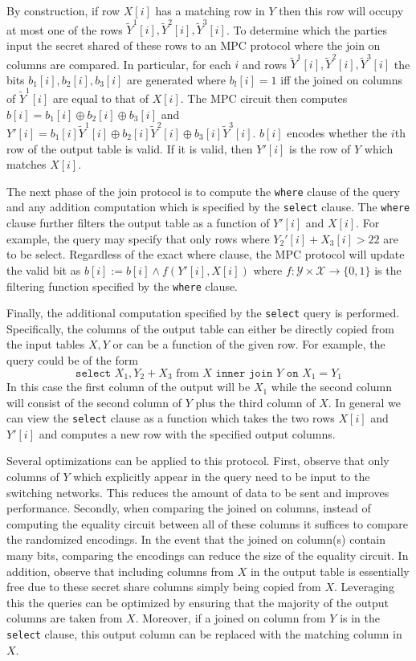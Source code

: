 By construction, if row $X[i]$ has a matching row in $Y$ then this row will occupy at most one of the rows ${\widetilde{Y}^1}[i],{\widetilde{Y}^2}[i],{\widetilde{Y}^3}[i]$. To determine which the parties input the secret shared of these rows to an MPC protocol where the join on columns are compared. In particular, for each $i$ and rows ${\widetilde{Y}^1}[i],{\widetilde{Y}^2}[i],{\widetilde{Y}^3}[i]$ the bits $b_1[i],b_2[i],b_3[i]$ are generated where $b_l[i]=1$ iff the joined on columns of ${\widetilde{Y}^1}[i]$ are equal to that of $X[i]$. The MPC circuit then computes $b[i]=b_1[i]\oplus b_2[i]\oplus b_3[i]$ and $Y'[i]=b_1[i]{\widetilde{Y}^1}[i]\oplus b_2[i]{\widetilde{Y}^2}[i]\oplus b_3[i]{\widetilde{Y}^3}[i]$. $b[i]$ encodes whether the $i$th row of the output table is valid. If it is valid, then $Y'[i]$ is the row of $Y$ which matches $X[i]$.

The next phase of the join protocol is to compute the \texttt{where} clause of the query and any addition computation which is specified by the \texttt{select} clause. The \texttt{where} clause further filters the output table as a function of $Y'[i]$ and $X[i]$. For example, the query may specify that only rows where $Y_2'[i] + X_3[i] > 22$  are to be select. Regardless of the exact where clause, the MPC protocol will update the valid bit as $b[i] := b[i] \wedge f(Y'[i], X[i])$ where $f: \mathcal{Y}\times \mathcal{X} \rightarrow \{0,1\}$ is the filtering function specified by the \texttt{where} clause.

Finally, the additional computation specified by the \texttt{select} query is performed. Specifically, the columns of the output table can either be directly copied from the input tables $X,Y$ or can be a function of the given row. For example, the query could be of the form 
$$
\texttt{select } X_1, Y_2 + X_3 \text{ from } X \texttt{ inner join } Y \texttt{ on } X_1 = Y_1
$$
In this case the first column of the output will be $X_1$ while the second column will consist of the second column of $Y$ plus the third column of $X$. In general we can view the \texttt{select} clause as a function which takes the two rows $X[i]$ and $Y'[i]$ and computes a new row with the specified output columns. 

Several optimizations can be applied to this protocol. First, observe that only columns of $Y$ which explicitly appear in the query need to be input to the switching networks. This reduces the amount of data to be sent and improves performance. Secondly, when comparing the joined on columns, instead of computing the equality circuit between all of these columns it suffices to compare the randomized encodings. In the event that the joined on column(s) contain many bits, comparing the encodings can reduce the size of the equality circuit. In addition, observe that including columns from $X$ in the output table is essentially free due to these secret share columns simply being copied from $X$. Leveraging this the queries can be optimized by ensuring that the majority of the output columns are taken from $X$. Moreover, if a joined on column from $Y$ is in the \texttt{select} clause, this output column can be replaced with the matching column in $X$.

